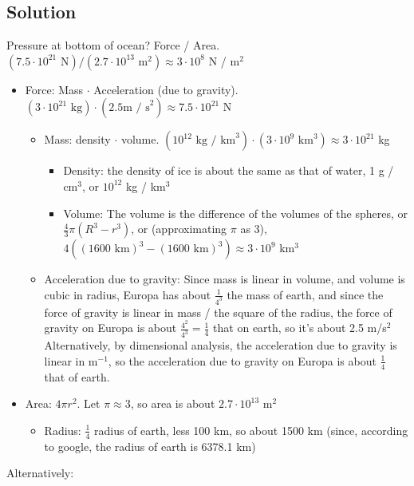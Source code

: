 \documentclass[solutions]{esg8012pset}
\begin{document}
\subsection{Solution}
  Pressure at bottom of ocean?  Force / Area.  $(7.5\cdot 10^{21}\text{ N}) / (2.7 \cdot 10^{13}\text{ m}^2) \approx 3 \cdot 10^8$ N / m$^2$
  \begin{itemize}
    \item Force: Mass $\cdot$ Acceleration (due to gravity). $(3 \cdot 10^{21}\text{ kg}) \cdot (2.5\text{m / s}^2) \approx 7.5\cdot 10^{21}$ N
      \begin{itemize}
        \item Mass: density $\cdot$ volume.  $(10^{12}\text{ kg / km}^3) \cdot (3 \cdot 10^9\text{ km}^3) \approx 3 \cdot 10^{21}$ kg
          \begin{itemize}
            \item Density: the density of ice is about the same as that of water, 1 g / cm$^3$, or $10^{12}$ kg / km$^3$
            \item Volume: The volume is the difference of the volumes of the spheres, or $\frac{4}{3}\pi (R^3 - r^3)$, or (approximating $\pi$ as 3), $4((1600\text{ km})^3 - (1600\text{ km})^3) \approx 3 \cdot 10^9$ km$^3$
          \end{itemize}
        \item Acceleration due to gravity: Since mass is linear in volume, and volume is cubic in radius, Europa has about $\frac{1}{4^3}$ the mass of earth, and since the force of gravity is linear in mass / the square of the radius, the force of gravity on Europa is about $\frac{4^2}{4^3} = \frac{1}{4}$ that on earth, so it's about 2.5 m/s$^2$  Alternatively, by dimensional analysis, the acceleration due to gravity is linear in m$^{-1}$, so the acceleration due to gravity on Europa is about $\frac{1}{4}$ that of earth.
      \end{itemize}
    \item Area: $4\pi r^2$.  Let $\pi \approx 3$, so area is about $2.7 \cdot 10^{13}$ m$^2$
      \begin{itemize}
        \item Radius: $\frac{1}{4}$ radius of earth, less 100 km, so about 1500 km (since, according to google, the radius of earth is 6378.1 km)
      \end{itemize}
  \end{itemize}
  \vspace{2em}
  \noindent Alternatively: \par
\end{document}
